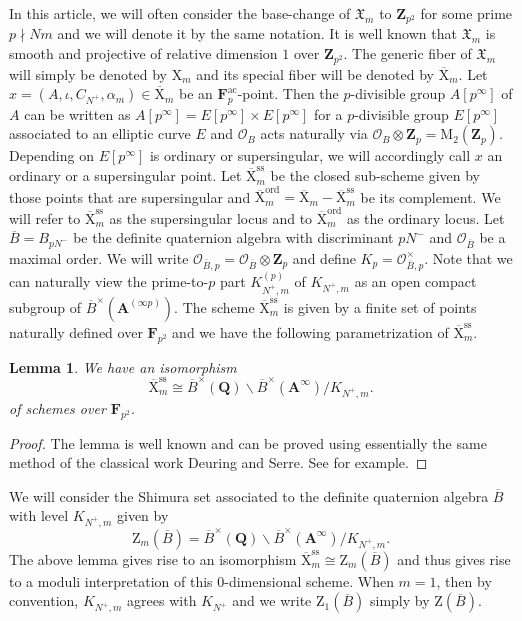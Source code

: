\documentclass[10pt]{amsart}
\newcommand*\Z{\mathds{Z}}
\newcommand*\ZZ{|[draw,circle]| \Z_2}
\numberwithin{equation}{section}
\theoremstyle{plain}
\newtheorem{lemma}[theorem]{Lemma}
\numberwithin{equation}{section}
\theoremstyle{definition}
\theoremstyle{remark}
\def\ord{\mathrm{ord}}
\def\ac{\mathrm{ac}}
\def\interX{\mathfrak{X}}
\def\ss{\mathrm{ss}}
\def\ac{\mathrm{ac}}
\def\calO{\mathcal{O}}
\def\Adel{\mathbf{A}}
\def\FF{\mathbf{F}}
\def\QQ{\mathbf{Q}}
\def\ZZ{\mathbf{Z}}
\def\rmM{\mathrm{M}}
\def\rmX{\mathrm{X}}
\def\rmZ{\mathrm{Z}}
\begin{document}
In this article, we will often consider the base-change of $\interX_{m}$ to $\ZZ_{p^{2}}$ for some prime $p\nmid Nm$ and we will denote it by the same notation. It is well known that $\interX_{m}$ is smooth and projective of relative dimension $1$ over $\ZZ_{p^{2}}$. The generic fiber of $\interX_{m}$ will simply be denoted by $\rmX_{m}$ and its special fiber will be denoted by $\overline{\rmX}_{m}$. Let $x=(A, \iota,C_{N^{+}}, \alpha_{m})\in \overline{\rmX}_{m}$ be an $\FF^{\ac}_{p}$-point. Then the $p$-divisible group $A[p^{\infty}]$ of $A$ can be written as  $A[p^{\infty}]=E[p^{\infty}]\times E[p^{\infty}]$ for a $p$-divisible group $E[p^{\infty}]$ associated to an elliptic curve $E$ and $\calO_{B}$ acts naturally via $\calO_{B}\otimes \ZZ_{p}=\rmM_{2}(\ZZ_{p})$. Depending on $E[p^{\infty}]$ is {ordinary} or {supersingular}, we will accordingly call $x$ an ordinary or a supersingular point. Let $\overline{\rmX}^{\ss}_{m}$ be the closed sub-scheme given by those points that are supersingular and  $\overline{\rmX}^{\ord}_{m}=\overline{\rmX}_{m}-\overline{\rmX}^{\ss}_{m}$ be its complement. We will refer to $\overline{\rmX}^{\ss}_{m}$ as the {supersingular locus} and to $\overline{\rmX}^{\ord}_{m}$ as the {ordinary locus}.  Let $\overline{B}=B_{pN^{-}}$ be the definite quaternion algebra with discriminant $pN^{-}$ and $\calO_{\overline{B}}$ be a maximal order. We will write $\calO_{\overline{B}, p}=\calO_{\overline{B}}\otimes\ZZ_{p}$ and define $K_{p}=\calO^{\times}_{\overline{B}, p}$. Note that we can naturally view the prime-to-$p$ part  $K^{(p)}_{N^{+},m}$ of $K_{N^{+},m}$ as an open compact subgroup of $\overline{B}^{\times}(\Adel^{(\infty p)})$. The scheme $\overline{\rmX}^{\ss}_{m}$ is given by a finite set of points naturally defined over $\FF_{p^{2}}$ and we have the following parametrization of  $\overline{\rmX}^{\ss}_{m}$. 

\begin{lemma}
We have an isomorphism 
\begin{equation*}
\overline{\rmX}^{\ss}_{m}\cong \overline{B}^{\times}(\QQ)\backslash \overline{B}^{\times}(\Adel^{\infty})/ K_{N^{+},m}.
\end{equation*}
of schemes over $\FF_{p^{2}}$.
\end{lemma}
\begin{proof}
The lemma is well known and can be proved using essentially the same method of the classical work Deuring and Serre. See \cite[Lemma 9]{DT} for example.
\end{proof}
We will consider the Shimura set associated to the definite quaternion algebra $\overline{B}$ with level $K_{N^{+}, m}$ given by
\begin{equation*}
\rmZ_{m}(\overline{B})=\overline{B}^{\times}(\QQ)\backslash \overline{B}^{\times}(\Adel^{\infty})/ K_{N^{+}, m}.
\end{equation*}
The above lemma gives rise to an isomorphism $\overline{\rmX}^{\ss}_{m}\cong \rmZ_{m}(\overline{B})$ and thus gives rise to a moduli interpretation of this $0$-dimensional scheme. When $m=1$, then by convention, $K_{N^{+}, m}$ agrees with $K_{N^{+}}$ and we write $\rmZ_{1}(\overline{B})$ simply by $\rmZ(\overline{B})$. 
\end{document}
